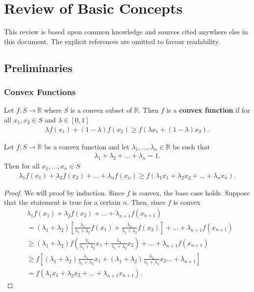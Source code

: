 \documentclass{memoir}
\begin{document}
\chapter{Review of Basic Concepts}
This review is based upon common knowledge and sources cited anywhere else in this document. The explicit references are omitted to favour readability.

\section{Preliminaries}
\subsection{Convex Functions}
\begin{definition}
    Let $f:S\to \mathbb{R}$ where $S$ is a convex subset of $\mathbb{R}$. Then $f$ is a \textbf{convex function} if for all $x_1,x_2 \in S$ and $\lambda \in [0,1]$
    \begin{align*}
        \lambda f(x_1) + (1- \lambda)f(x_2) \ge f( \lambda x_1 + (1- \lambda) x_2).
    \end{align*}
\end{definition}

\begin{theorem}
    Let $f:S \to \mathbb{R}$ be a convex function and let $\lambda_1,\ldots,\lambda_n \in \mathbb{R}$ be such that
    \begin{align*}
        \lambda_1 + \lambda_2 + \ldots + \lambda_n = 1.
    \end{align*}
    Then for all $x_1,\ldots,x_n \in S$
    \begin{align*}
        \lambda_1 f(x_1) + \lambda_2 f(x_2) + \ldots + \lambda_n f(x_n) \ge f(\lambda_1 x_1 + \lambda_2 x_2 + \ldots + \lambda_n x_n).
    \end{align*}
\end{theorem}
\begin{proof}
    We will proof by induction. Since $f$ is convex, the base case holds. Suppose that the statement is true for a certain $n$. Then, since $f$ is convex
    \begin{align*}
        &\lambda_1 f(x_1) + \lambda_2 f(x_2) + \ldots + \lambda_{n+1} f(x_{n+1}) \\
        &= (\lambda_1+\lambda_2)\left[\frac{\lambda_1}{\lambda_1 + \lambda_2} f(x_1) + \frac{\lambda_2}{\lambda_1+\lambda_2}f(x_2)\right] + \ldots + \lambda_{n+1} f(x_{n+1})  \\
        &\ge (\lambda_1 + \lambda_2)f\left( \frac{\lambda_1}{\lambda_1 + \lambda_2} x_1 + \frac{\lambda_2}{\lambda_1+\lambda_2}x_2\right) + \ldots + \lambda_{n+1} f(x_{n+1}) \\
        &\ge f\left[(\lambda_1 + \lambda_2) \frac{\lambda_1}{\lambda_1 + \lambda_2} x_1 + (\lambda_1 + \lambda_2)\frac{\lambda_2}{\lambda_1+\lambda_2}x_2\ldots + \lambda_{n+1}\right] \\
        &= f(\lambda_1 x_1 + \lambda_2 x_2 + \ldots + \lambda_{n+1} x_{n+1}).
    \end{align*}
\end{proof}
\end{document}
